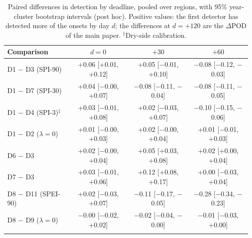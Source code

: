 \begin{table}[tbp]
\caption{Paired differences in detection by deadline, pooled over regions, with 95\% year-cluster bootstrap
intervals (post hoc). Positive values: the first detector has detected more of the onsets by day $d$;
the differences at $d=+120$ are the $\Delta$POD of the main paper. $^{\ddagger}$Dry-side calibration.}
\label{tab:deadlinediff}
\footnotesize\setlength{\tabcolsep}{2pt}
\begin{tabular*}{\textwidth}{@{\extracolsep\fill}lccc}
\toprule
Comparison & $d=0$ & $+30$ & $+60$\\
\midrule
D1 $-$ D3 (SPI-90) & +0.06 [+0.01, +0.12] & +0.05 [$-$0.01, +0.10] & $-$0.08 [$-$0.12, $-$0.03] \\
D1 $-$ D7 (SPI-30) & +0.04 [$-$0.00, +0.07] & $-$0.08 [$-$0.11, $-$0.04] & $-$0.08 [$-$0.11, $-$0.05] \\
D1 $-$ D4 (SPI-3)$^{\ddagger}$ & +0.03 [$-$0.01, +0.08] & +0.02 [$-$0.03, +0.07] & $-$0.10 [$-$0.15, $-$0.06] \\
D1 $-$ D2 ($\lambda=0$) & +0.01 [$-$0.00, +0.03] & +0.02 [$-$0.00, +0.04] & +0.01 [$-$0.01, +0.03] \\
D6 $-$ D3 & +0.02 [$-$0.00, +0.04] & +0.05 [+0.03, +0.08] & +0.02 [+0.00, +0.04] \\
D7 $-$ D3 & +0.03 [$-$0.01, +0.06] & +0.12 [+0.08, +0.17] & +0.00 [$-$0.03, +0.04] \\
\midrule
D8 $-$ D11 (SPEI-90) & +0.02 [$-$0.03, +0.07] & $-$0.11 [$-$0.17, $-$0.05] & $-$0.28 [$-$0.34, $-$0.23] \\
D8 $-$ D9 ($\lambda=0$) & $-$0.00 [$-$0.02, +0.02] & $-$0.02 [$-$0.04, $-$0.00] & $-$0.01 [$-$0.03, +0.00] \\
\botrule
\end{tabular*}
\end{table}
